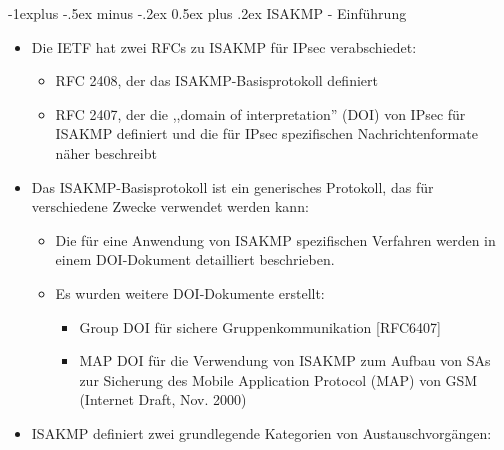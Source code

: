 \documentclass[a4paper]{article}
\makeatletter
\renewcommand{\subsection}{\@startsection{subsection}{2}{0mm}%
 {-1explus -.5ex minus -.2ex}%
 {0.5ex plus .2ex}%
 {\normalfont\normalsize\bfseries}}
\makeatother
\begin{document}
\begin{multicols}{3}
    \subsection{ISAKMP - Einführung}

    \begin{itemize}
        \item
              Die IETF hat zwei RFCs zu ISAKMP für IPsec verabschiedet:

              \begin{itemize}
                  \item
                        RFC 2408, der das ISAKMP-Basisprotokoll definiert
                  \item
                        RFC 2407, der die ,,domain of interpretation'' (DOI) von IPsec für
                        ISAKMP definiert und die für IPsec spezifischen Nachrichtenformate
                        näher beschreibt
              \end{itemize}
        \item
              Das ISAKMP-Basisprotokoll ist ein generisches Protokoll, das für
              verschiedene Zwecke verwendet werden kann:

              \begin{itemize}
                  \item
                        Die für eine Anwendung von ISAKMP spezifischen Verfahren werden in
                        einem DOI-Dokument detailliert beschrieben.
                  \item
                        Es wurden weitere DOI-Dokumente erstellt:

                        \begin{itemize}
                            \item
                                  Group DOI für sichere Gruppenkommunikation {[}RFC6407{]}
                            \item
                                  MAP DOI für die Verwendung von ISAKMP zum Aufbau von SAs zur
                                  Sicherung des Mobile Application Protocol (MAP) von GSM (Internet
                                  Draft, Nov. 2000)
                        \end{itemize}
              \end{itemize}
        \item
              ISAKMP definiert zwei grundlegende Kategorien von Austauschvorgängen:


\end{itemize}
\end{multicols}
\end{document}
